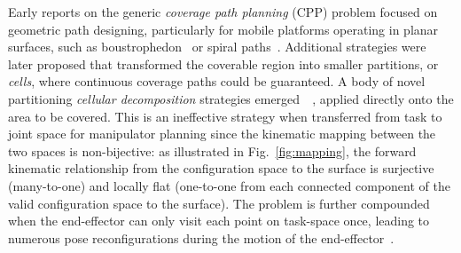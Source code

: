 \documentclass[journal]{IEEEtran}
\begin{document}



Early reports on the generic \textit{coverage path planning} (CPP) problem focused on geometric path designing, particularly for mobile platforms operating in planar surfaces, such as boustrophedon~\cite{choset1998coverage} or spiral paths~\cite{hassan2018a}. 
Additional strategies were later proposed that transformed the coverable region into smaller partitions, or \textit{cells}, where continuous coverage paths could be guaranteed. A body of novel partitioning \textit{cellular decomposition} strategies emerged~\cite{choset2000exact}~\cite{huang2001optimal}, applied directly onto the area to be covered. This is an ineffective strategy when transferred from task to joint space for manipulator planning since the kinematic mapping between the two spaces is non-bijective: as illustrated in Fig.~\ref{fig:mapping}, the forward kinematic relationship from the configuration space to the surface is surjective (many-to-one) and locally flat (one-to-one from each connected component of the valid configuration space to the surface). 
The problem is further compounded when the end-effector can only visit each point on task-space once, leading to numerous pose reconfigurations during the motion of the end-effector~\cite{rososhansky2011coverage}.
\end{document}
